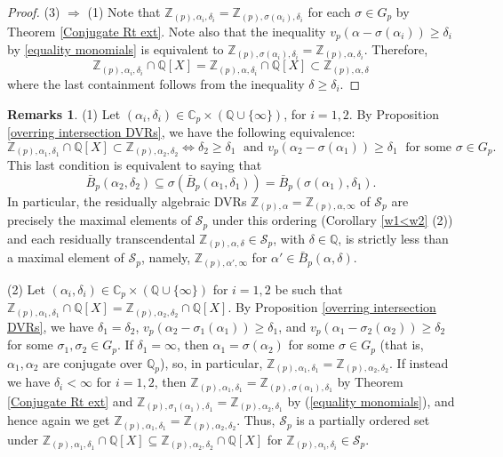 \documentclass[10pt]{article}
\numberwithin{equation}{section}
\theoremstyle{definition}
\newtheorem{Rems}[equation]{Remarks}
\theoremstyle{definition}
\newcommand{\Q}{\mathbb{Q}}
\newcommand{\Z}{\mathbb{Z}}
\newcommand{\C}{\mathbb{C}}
\newcommand\rc { \color{red}}
\newcommand\bc { \color{blue}}
\begin{document}
\begin{proof}
(3) $\Rightarrow$ (1) Note that $\Z_{(p),\alpha_i,\delta_i}=\Z_{(p),\sigma(\alpha_i),\delta_i}$ for each $\sigma\in G_p$  
by Theorem \ref{Conjugate Rt ext}. Note also that the inequality $v_p(\alpha-\sigma(\alpha_i))\geq\delta_i$ 
by \eqref{equality monomials} is equivalent to $\Z_{(p),\sigma(\alpha_i),\delta_i}=\Z_{(p),\alpha,\delta_i}$. Therefore,
$$\Z_{(p),\alpha_i,\delta_i}\cap\Q[X]=\Z_{(p),\alpha,\delta_i}\cap\Q[X]\subset\Z_{(p),\alpha,\delta}$$
where the last containment follows from the inequality $\delta\geq\delta_i$.
\end{proof}



\begin{Rems}\label{ball containment}
(1) Let $(\alpha_i,\delta_i)\in\C_p\times(\Q\cup\{\infty\})$, for $i=1,2$. By  Proposition \ref{overring intersection DVRs}, we have the following equivalence: 
$$\Z_{(p),\alpha_1,\delta_1}\cap\Q[X]\subset\Z_{(p),\alpha_2,\delta_2}\Leftrightarrow \delta_2\geq\delta_1 \;\text{ and } v_p(\alpha_2-\sigma(\alpha_1)) \geq \delta_1 \;\text{ for some }\sigma\in G_p.$$ 
This last condition is equivalent to saying that 
$$\bar B_p(\alpha_2,\delta_2)\subseteq\sigma(\bar B_p(\alpha_1,\delta_1))=\bar B_p(\sigma(\alpha_1),\delta_1).$$
In particular, the residually algebraic DVRs $\Z_{(p),\alpha}=\Z_{(p),\alpha,\infty}$ of $\mathcal{S}_p$ are precisely the maximal elements of $\mathcal{S}_p$ under this ordering (Corollary \ref{w1<w2} (2)) and each residually transcendental $\Z_{(p),\alpha,\delta}\in\mathcal{S}_p$, with $\delta\in\Q$, is strictly less than a maximal element of $\mathcal{S}_p$, namely, $\Z_{(p),\alpha',\infty}$ for $\alpha'\in\bar B_p(\alpha,\delta)$.

(2) Let $(\alpha_i,\delta_i)\in\C_p\times(\Q\cup\{\infty\})$ for $i=1,2$ be such that $\Z_{(p),\alpha_1,\delta_1}\cap\Q[X] = \Z_{(p),\alpha_2,\delta_2} \cap \Q[X]$. By Proposition \ref{overring intersection DVRs}, we have  
$\delta_1 = \delta_2$, $v_p(\alpha_2-\sigma_1(\alpha_1)) \geq \delta_1$, and 
$v_p(\alpha_1-\sigma_2(\alpha_2)) \geq \delta_2$ for some $\sigma_1, \sigma_2 \in G_p$.
If $\delta_1 = \infty$, then $\alpha_1 = \sigma(\alpha_2)$ for some $\sigma \in G_p$ (that is, $\alpha_1,\alpha_2$ are conjugate over $\Q_p$),
so, in particular, $\Z_{(p),\alpha_1,\delta_1} = \Z_{(p),\alpha_2,\delta_2}$. If instead we have $\delta_i < \infty$
for $i=1, 2$, then $\Z_{(p),\alpha_1,\delta_1} = \Z_{(p), \sigma(\alpha_1),\delta_1}$ by Theorem \ref{Conjugate Rt ext}
and $\Z_{(p), \sigma_1(\alpha_1),\delta_1} = \Z_{(p), \alpha_2,\delta_1}$ by (\ref{equality monomials}),
and hence again we get $\Z_{(p),\alpha_1,\delta_1} = \Z_{(p),\alpha_2,\delta_2}$.
Thus, $\mathcal{S}_p$ is a partially ordered set under $\Z_{(p),\alpha_1,\delta_1}\cap\Q[X] \subseteq \Z_{(p),\alpha_2,\delta_2} \cap \Q[X]$
for $\Z_{(p),\alpha_i,\delta_i} \in \mathcal{S}_p$.
\end{Rems}
\end{document}
